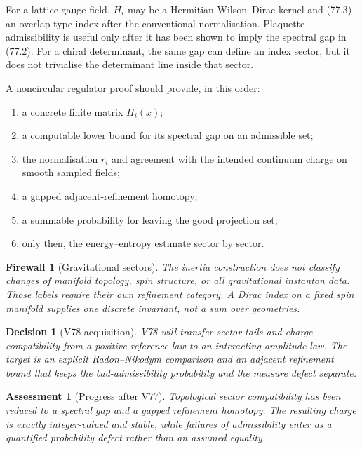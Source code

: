 \documentclass[11pt]{article}
\newtheorem{assessment}[theorem]{Assessment}
\newtheorem{firewall}[theorem]{Firewall}
\newtheorem{decision}[theorem]{Decision}
\begin{document}
For a lattice gauge field, \(H_i\) may be a Hermitian Wilson--Dirac
kernel and (77.3) an overlap-type index after the conventional
normalisation.  Plaquette admissibility is useful only after it has
been shown to imply the spectral gap in (77.2).  For a chiral
determinant, the same gap can define an index sector, but it does not
trivialise the determinant line inside that sector.

\begin{ledger}
\label{led:v11v77-chain}
A noncircular regulator proof should provide, in this order:
\begin{enumerate}
\item a concrete finite matrix \(H_i(x)\);
\item a computable lower bound for its spectral gap on an admissible
      set;
\item the normalisation \(r_i\) and agreement with the intended
      continuum charge on smooth sampled fields;
\item a gapped adjacent-refinement homotopy;
\item a summable probability for leaving the good projection set;
\item only then, the energy--entropy estimate sector by sector.
\end{enumerate}
\end{ledger}

\begin{firewall}[Gravitational sectors]
\label{fire:v11v77-gravity}
The inertia construction does not classify changes of manifold
topology, spin structure, or all gravitational instanton data.
Those labels require their own refinement category.  A Dirac index on
a fixed spin manifold supplies one discrete invariant, not a sum over
geometries.
\end{firewall}

\begin{decision}[V78 acquisition]
\label{dec:v11v77-next}
V78 will transfer sector tails and charge compatibility from a
positive reference law to an interacting amplitude law.  The target
is an explicit Radon--Nikodym comparison and an adjacent refinement
bound that keeps the bad-admissibility probability and the measure
defect separate.
\end{decision}

\begin{assessment}[Progress after V77]
\label{ass:v11v77-status}
Topological sector compatibility has been reduced to a spectral gap
and a gapped refinement homotopy.  The resulting charge is exactly
integer-valued and stable, while failures of admissibility enter as a
quantified probability defect rather than an assumed equality.
\end{assessment}
\end{document}
